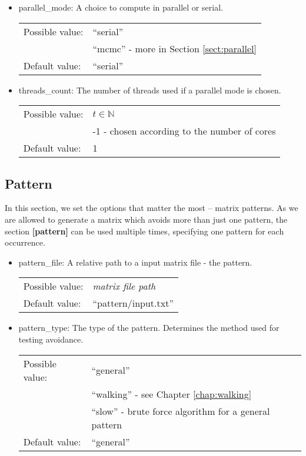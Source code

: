 \begin{itemize}
\item parallel\_mode: A choice to compute in parallel or serial.

\begin{tabular}{ll}
Possible value: & ``serial'' \\
& ``mcmc'' - more in Section \ref{sect:parallel} \\
Default value: & ``serial''
\end{tabular}

\item threads\_count: The number of threads used if a parallel mode is chosen.

\begin{tabular}{ll}
Possible value: & $t\in\mathbb{N}$ \\
& -1 - chosen according to the number of cores \\
Default value: & 1
\end{tabular}
\end{itemize}

\subsection{Pattern}
In this section, we set the options that matter the most -- matrix patterns. As we are allowed to generate a matrix which avoids more than just one pattern, the section \textbf{[pattern]} can be used multiple times, specifying one pattern for each occurrence.
\begin{itemize}
\item pattern\_file: A relative path to a input matrix file - the pattern.

\begin{tabular}{ll}
Possible value: & \textit{matrix file path} \\
Default value: & ``pattern/input.txt''
\end{tabular}

\item pattern\_type: The type of the pattern. Determines the method used for testing avoidance.

\begin{tabular}{ll}
Possible value: & ``general'' \\
& ``walking'' - see Chapter \ref{chap:walking} \\
& ``slow'' - brute force algorithm for a general pattern \\
Default value: & ``general''
\end{tabular}
\end{itemize}

